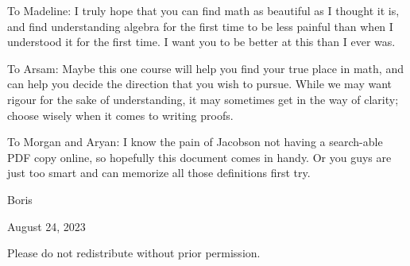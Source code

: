 \medskip

To Madeline:
I truly hope that you can find math as beautiful as I thought it is,
and find understanding algebra for the first time
to be less painful than when I understood it for the first time.
I want you to be better at this than I ever was.

To Arsam:
Maybe this one course will help you find your true place in math,
and can help you decide the direction that you wish to pursue.
While we may want rigour for the sake of understanding,
it may sometimes get in the way of clarity;
choose wisely when it comes to writing proofs.

To Morgan and Aryan:
I know the pain of
Jacobson not having a search-able PDF copy online,
so hopefully this document comes in handy.
Or you guys are just too smart
and can memorize all those definitions first try.

\vspace{5mm}

Boris

August 24, 2023

\vspace{5mm}

Please do not redistribute without prior permission.

